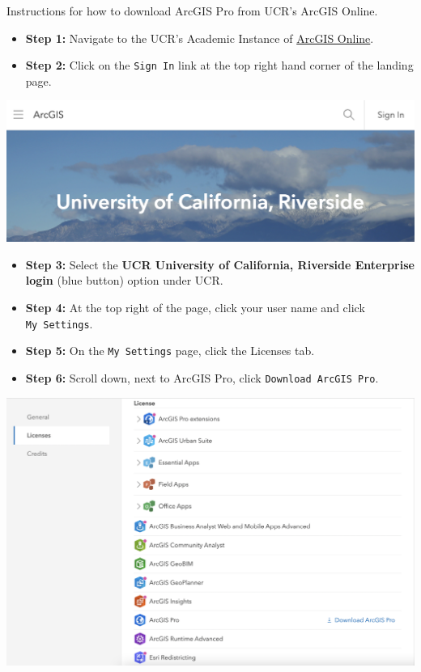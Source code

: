 \documentclass[
]{book}
\begin{document}
Instructions for how to download ArcGIS Pro from UCR's ArcGIS Online.

\begin{itemize}
\item
  \textbf{Step 1:} Navigate to the UCR's Academic Instance of \href{https://ucr.maps.arcgis.com/home/index.html}{ArcGIS Online}.
\item
  \textbf{Step 2:} Click on the \texttt{Sign\ In} link at the top right hand corner of the landing page.
\end{itemize}

\begin{center}\includegraphics{images/esri_signin} \end{center}

\begin{itemize}
\item
  \textbf{Step 3:} Select the \textbf{UCR University of California, Riverside Enterprise login} (blue button) option under UCR.
\item
  \textbf{Step 4:} At the top right of the page, click your user name and click \texttt{My\ Settings}.
\item
  \textbf{Step 5:} On the \texttt{My\ Settings} page, click the Licenses tab.
\item
  \textbf{Step 6:} Scroll down, next to ArcGIS Pro, click \texttt{Download\ ArcGIS\ Pro}.
\end{itemize}

\begin{center}\includegraphics{images/esri_pro} \end{center}
\end{document}
